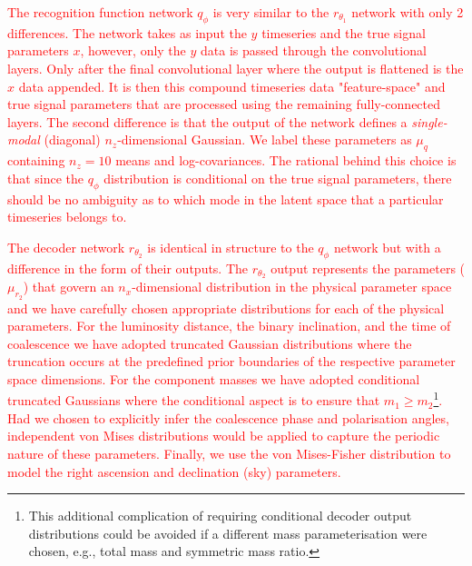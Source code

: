\documentclass[%
showpacs,
nofootinbib,
 amsmath,amssymb,
 aps,
 twocolumn,
 prl,
 reprint,
floatfix,
]{revtex4-1}
\newcommand{\new}[1]{\textcolor{red}{#1}}
\begin{document}
%
% 
\new{The recognition function network $q_{\phi}$ is very similar to the
$r_{\theta_1}$ network with only 2 differences. The network takes as input the
$y$ timeseries and the true signal parameters $x$, however, only the $y$ data
is passed through the convolutional layers. Only after the final convolutional
layer where the output is flattened is the $x$ data appended. It is then this
compound timeseries data "feature-space" and true signal parameters that are
processed using the remaining fully-connected layers. The second difference is
that the output of the network defines a \emph{single-modal} (diagonal)
$n_z$-dimensional Gaussian. We label these parameters as $\mu_{q}$ containing
$n_z=10$ means and log-covariances. The rational behind this choice is that
since the $q_{\phi}$ distribution is conditional on the true signal parameters,
there should be no ambiguity as to which mode in the latent space that a
particular timeseries belongs to.}      

%
%
\new{The decoder network $r_{\theta_2}$ is identical in structure to the
$q_{\phi}$ network but with a difference in the form of their outputs. The
$r_{\theta_2}$ output represents the parameters ($\mu_{r_2}$) that govern an
$n_x$-dimensional distribution in the physical parameter space and we have
carefully chosen appropriate distributions for each of the physical parameters.
For the luminosity distance, the binary inclination, and the time of
coalescence we have adopted truncated Gaussian distributions where the
truncation occurs at the predefined prior boundaries of the respective
parameter space dimensions. For the component masses we have adopted
conditional truncated Gaussians where the conditional aspect is to ensure that
$m_{1}\geq m_{2}$\footnote{This additional complication of requiring conditional
decoder output distributions could be avoided if a different mass
parameterisation were chosen, e.g., total mass and symmetric mass ratio.}. Had
we chosen to explicitly infer the coalescence phase and polarisation angles,
independent von Mises distributions would be applied to capture the periodic
nature of these parameters. Finally, we use the von Mises-Fisher distribution
to model the right ascension and declination (sky) parameters.}     
\end{document}
